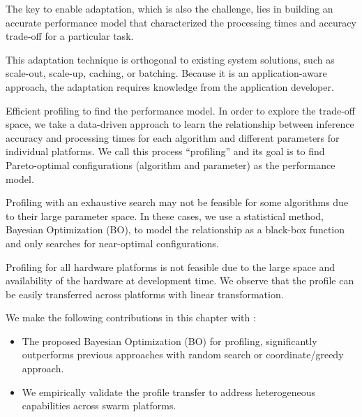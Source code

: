 The key to enable adaptation, which is also the challenge, lies in building an
accurate performance model that characterized the processing times and accuracy
trade-off for a particular task.

This adaptation technique is orthogonal to existing system solutions, such as
scale-out, scale-up, caching, or batching. Because it is an application-aware
approach, the adaptation requires knowledge from the application developer.

Efficient profiling to find the performance model. In order to explore the
trade-off space, we take a data-driven approach to learn the relationship
between inference accuracy and processing times for each algorithm and different
parameters for individual platforms. We call this process ``profiling'' and its
goal is to find Pareto-optimal configurations (algorithm and parameter) as the
performance model.

Profiling with an exhaustive search may not be feasible for some algorithms due
to their large parameter space. In these cases, we use a statistical method,
Bayesian Optimization (BO), to model the relationship as a black-box function
and only searches for near-optimal configurations.

Profiling for all hardware platforms is not feasible due to the large space and
availability of the hardware at development time. We observe that the profile
can be easily transferred across platforms with linear transformation.

We make the following contributions in this chapter with \brt{}:

\begin{itemize}

\item The proposed Bayesian Optimization (BO) for profiling, significantly
  outperforms previous approaches with random search or coordinate/greedy
  approach.
\item We empirically validate the profile transfer to address heterogeneous
  capabilities across swarm platforms.

\end{itemize}


